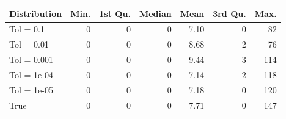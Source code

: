 \begin{figure} 
\begin{tabular}{lrrrrrr}
 Distribution & Min. & 1st Qu. & Median & Mean & 3rd Qu. & Max. \\ 
  \hline
\hline
Tol =  0.1 & 0 & 0 & 0 & 7.10 & 0 & 82 \\ 
  Tol =  0.01 & 0 & 0 & 0 & 8.68 & 2 & 76 \\ 
  Tol =  0.001 & 0 & 0 & 0 & 9.44 & 3 & 114 \\ 
  Tol =  1e-04 & 0 & 0 & 0 & 7.14 & 2 & 118 \\ 
  Tol =  1e-05 & 0 & 0 & 0 & 7.18 & 0 & 120 \\ 
  True & 0 & 0 & 0 & 7.71 & 0 & 147 \\ 
  \end{tabular}
\label{tab:SummaryTable}
\end{figure} 
